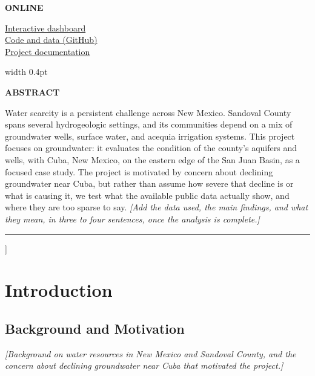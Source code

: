 \documentclass[10pt,twocolumn,letterpaper]{article}
\newif\ifdraftnotes \draftnotestrue   %
\newcommand{\draftnote}[1]{\ifdraftnotes{\color{draftorange}\itshape[#1]}\fi}
\newcommand{\infohead}[1]{{\color{titleblue}\footnotesize\bfseries\MakeUppercase{#1}}\par\vspace{2pt}}
\begin{document}
{\begin{minipage}[t]{0.25\textwidth}
  \infohead{Online}
  \href{https://eng220aquiferproject.streamlit.app/}{Interactive dashboard}\\
  \href{https://github.com/pdjordj11/eng_220_aquifer_project}{Code and data (GitHub)}\\
  \href{https://pdjordj11.github.io/eng_220_aquifer_project/}{Project documentation}
\end{minipage}%
\hfill{\color{accentblue}\vrule width 0.4pt}\hfill
\begin{minipage}[t]{0.70\textwidth}
  \infohead{Abstract}
  \small
  Water scarcity is a persistent challenge across New Mexico. Sandoval County spans several
  hydrogeologic settings, and its communities depend on a mix of groundwater wells, surface water,
  and acequia irrigation systems. This project focuses on groundwater: it evaluates the condition
  of the county's aquifers and wells, with Cuba, New Mexico, on the eastern edge of the San Juan
  Basin, as a focused case study. The project is motivated by concern about declining groundwater
  near Cuba, but rather than assume how severe that decline is or what is causing it, we test what
  the available public data actually show, and where they are too sparse to say.
  \draftnote{Add the data used, the main findings, and what they mean, in three to four
  sentences, once the analysis is complete.}
\end{minipage}
\par\vspace{1.6ex}
{\color{accentblue}\rule{\textwidth}{0.4pt}}\par\vspace{2.6ex}
}]
\thispagestyle{firstpage}

\section{Introduction}
\subsection{Background and Motivation}
\draftnote{Background on water resources in New Mexico and Sandoval County, and the concern about
declining groundwater near Cuba that motivated the project.}
\end{document}
